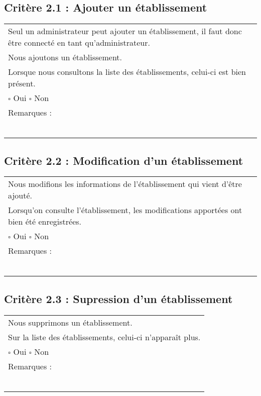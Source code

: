  	\subsection*{Critère 2.1 : Ajouter un établissement}
  		\begin{center}
    	 		\begin{tabular}[h]{|p{}|}
			\hline
				Seul un administrateur peut ajouter un établissement, il faut donc être connecté en tant qu'administrateur.\\
				Nous ajoutons un établissement. \\
				Lorsque nous consultons la liste des établissements, celui-ci est bien présent. \\
						
				
				$\square$ Oui  \hfill \hfill $\square$ Non \\\hline Remarques : \\ ~\\
			 \\\hline
     		\end{tabular}
  		\end{center}	
  		
  	\subsection*{Critère 2.2 : Modification d'un établissement}
  		\begin{center}
    	 		\begin{tabular}[h]{|p{}|}
			\hline
				Nous modifions les informations de l'établissement qui vient d'être ajouté.\\
				Lorsqu'on consulte l'établissement, les modifications apportées ont bien été enregistrées. \\			
				
				$\square$ Oui  \hfill \hfill $\square$ Non \\\hline Remarques : \\ ~\\
			 \\\hline
     		\end{tabular}
  		\end{center}	
  		
  	\subsection*{Critère 2.3 : Supression d'un établissement}
  		\begin{center}
    	 		\begin{tabular}[h]{|p{}|}
			\hline
				Nous supprimons un établissement. \\
				Sur la liste des établissements, celui-ci n'apparaît plus. \\
				
				$\square$ Oui  \hfill \hfill $\square$ Non \\\hline Remarques : \\ ~\\
			 \\\hline
     		\end{tabular}
  		\end{center}	
  		
